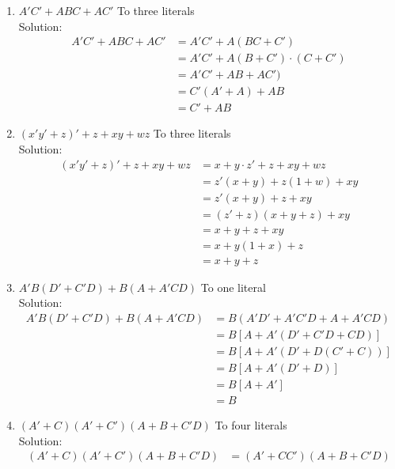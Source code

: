 \documentclass[a4paper,12pt]{article}
\begin{document}
\begin{enumerate}[label=\textbf{\arabic* .}]
\begin{enumerate}[label=\alph* .]
    \item $A'C' + ABC + AC'$  \hspace{8cm} To three literals\\[0.3cm]
        {\color{blue} Solution:
        \begin{align*}
            A'C' + ABC + AC' &= A'C' + A(BC + C')\\
            &= A'C' + A(B+C') \cdot (C+C')\\
            &= A'C' + AB+AC')\\
            &= C'(A'+A) +AB\\
            &= C'+AB
        \end{align*}}
    \item $(x'y'+z)'+z+xy+ wz$ \hspace{7.075cm} To three literals\\[0.3cm]
        {\color{blue} Solution:
        \begin{align*}
           (x'y'+z)'+z+xy+ wz &= x+y \cdot z'+ z +xy + wz\\
            &= z'(x+y) + z (1 + w) +xy\\
            &= z'(x+y) +z +xy\\
            &= (z'+z)(x+y+z) +xy\\
            &= x+ y+ z+xy\\
            &= x+ y(1+x) +z\\
            &= x+y+z
        \end{align*}}
    \item $A'B(D'+C'D)+B(A+A'CD)$ \hspace{5.55cm} To one literal\\[0.3cm]
        {\color{blue} Solution:
        \begin{align*}
           A'B(D'+C'D)+B(A+A'CD) &=B(A'D'+A'C'D+A+A'CD)\\
           &= B[A+ A'(D'+C'D+CD)]\\
           &= B[A+A'(D'+D(C'+C))]\\
           &= B[A+A'(D'+D)]\\
           &= B[A+A']\\
           &= B
        \end{align*}}
    \item $(A' + C) (A' + C') (A + B + C'D)$\hspace{5.73cm}  To four literals\\[0.3cm]
        {\color{blue} Solution:
        \begin{align*}
           (A' + C) (A' + C') (A + B + C'D)&= (A'+CC')(A+B+C'D)\\

\end{align*}}
\end{enumerate}
\end{enumerate}
\end{document}

